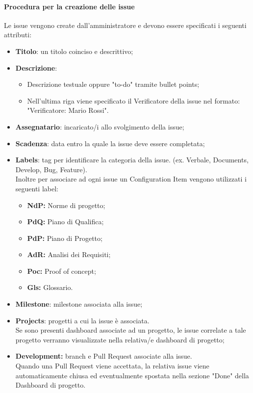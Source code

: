 \hypertarget{par:proceduraCreazioneIssue}{\paragraph*{Procedura per la creazione delle issue}}
Le issue vengono create dall'amministratore e devono essere specificati i seguenti attributi:
\begin{itemize}
    \item \textbf{Titolo}: un titolo coinciso e descrittivo;
    \item \textbf{Descrizione}:
    \begin{itemize}
        \item Descrizione testuale oppure "to-do" tramite bullet points;
        \item Nell'ultima riga viene specificato il Verificatore della issue nel formato: "Verificatore: Mario Rossi".
    \end{itemize} 
    \item \textbf{Assegnatario}: incaricato/i allo svolgimento della issue;
    \item \textbf{Scadenza}: data entro la quale la issue deve essere completata;
    \item \textbf{Labels}: tag per identificare la categoria della issue. (ex. Verbale, Documents, Develop, Bug, Feature).\\
    Inoltre per associare ad ogni issue un Configuration Item vengono utilizzati i seguenti label:
    \begin{itemize}
        \item \textbf{NdP:} Norme di progetto;
        \item \textbf{PdQ:} Piano di Qualifica;
        \item \textbf{PdP:} Piano di Progetto;
        \item \textbf{AdR:} Analisi dei Requisiti;
        \item \textbf{Poc:} Proof of concept;
        \item \textbf{Gls:} Glossario.
    \end{itemize}
    \item \textbf{Milestone}: milestone associata alla issue;
    \item \textbf{Projects}: progetti a cui la issue è associata. \\
    Se sono presenti dashboard associate ad un progetto, le issue correlate a tale progetto verranno visualizzate nella relativa/e dashboard di progetto;
    \item \textbf{Development:} branch e Pull Request associate alla issue. \\
    Quando una Pull Request viene accettata, la relativa issue viene automaticamente chiusa ed eventualmente spostata nella sezione "Done" della Dashboard di progetto.
\end{itemize}

